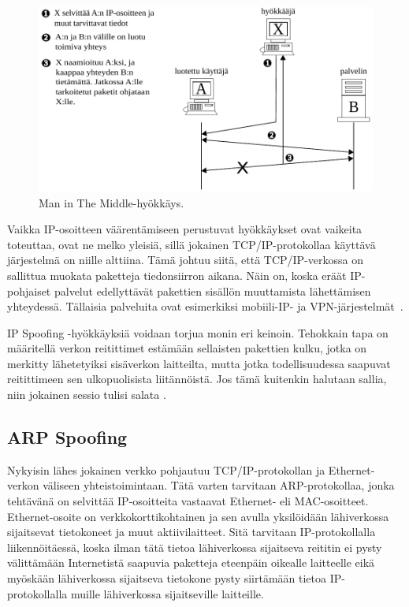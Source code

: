 \begin{figure}[ht]
\centering
\includegraphics[width=13cm]{pics/MiTM.pdf}
\caption{Man in The Middle-hyökkäys.}
\label{Man}
\end{figure}

Vaikka IP-osoitteen väärentämiseen perustuvat hyökkäykset ovat
vaikeita toteuttaa, ovat ne melko yleisiä, sillä jokainen
TCP/IP-protokollaa käyttävä järjestelmä on niille alttiina. Tämä
johtuu siitä, että TCP/IP-verkossa on sallittua muokata paketteja
tiedonsiirron aikana. Näin on, koska eräät IP-pohjaiset palvelut
edellyttävät pakettien sisällön muuttamista lähettämisen
yhteydessä. Tällaisia palveluita ovat esimerkiksi mobiili-IP- ja
VPN-järjestelmät~\cite{DDOS}.

IP Spoofing -hyökkäyksiä voidaan torjua monin eri keinoin. Tehokkain
tapa on määritellä verkon reitittimet estämään sellaisten pakettien
kulku, jotka on merkitty lähetetyiksi sisäverkon laitteilta, mutta
jotka todellisuudessa saapuvat reitittimeen sen ulkopuolisista
liitännöistä. Jos tämä kuitenkin halutaan sallia, niin jokainen sessio
tulisi salata \cite{WEBS}. 

\subsection{ARP Spoofing}

Nykyisin lähes jokainen verkko pohjautuu TCP/IP-protokollan ja
Ethernet-verkon väliseen yhteistoimintaan. Tätä varten tarvitaan
ARP-pro\-to\-kol\-laa, jonka tehtävänä on selvittää IP-osoitteita
vastaavat Ethernet- eli MAC-osoitteet. Ethernet-osoite on
verkkokorttikohtainen ja sen avulla yksilöidään lähiverkossa
sijaitsevat tietokoneet ja muut aktiivilaitteet.  Sitä tarvitaan
IP-protokollalla liikennöitäessä, koska ilman tätä tietoa
lähiverkossa sijaitseva reititin ei pysty
välittämään Internetistä saapuvia paketteja eteenpäin oikealle
laitteelle eikä myöskään lähiverkossa sijaitseva tietokone pysty
siirtämään tietoa IP-protokollalla muille lähiverkossa sijaitseville
laitteille.

